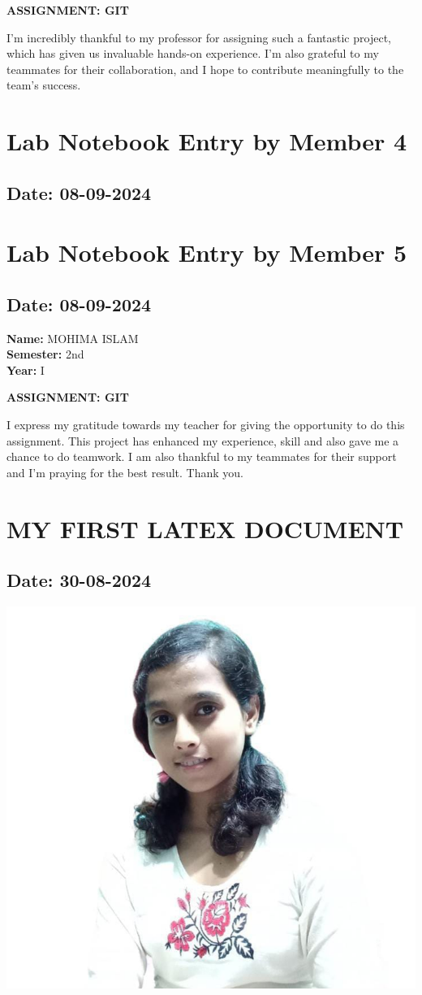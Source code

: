 \documentclass[12pt]{article}
\begin{document}
\begin{center}
\Huge \textbf{ASSIGNMENT: GIT}
\end{center}

I'm incredibly thankful to my professor for assigning such a fantastic project, which has given us invaluable hands-on experience. I'm also grateful to my teammates for their collaboration, and I hope to contribute meaningfully to the team's success.

\newpage
\section{Lab Notebook Entry by Member 4}
\subsection*{Date: 08-09-2024}
\newpage


\section{Lab Notebook Entry by Member 5}
\subsection*{Date: 08-09-2024}

\begin{flushright}
\textbf{Name:} MOHIMA ISLAM \\
\textbf{Semester:} 2nd \\
\textbf{Year:} I \\
\end{flushright}

\begin{center}
\Huge \textbf{ASSIGNMENT: GIT}
\end{center}

I express my gratitude towards my teacher for giving the opportunity to do this assignment. This project has enhanced my experience, skill and also gave me a chance to do teamwork. I am also thankful to my teammates for their support and I'm praying for the best result. Thank you.
\newpage
\section{MY FIRST LATEX DOCUMENT}
\subsection*{Date: 30-08-2024}
 \begin{center}
        \includegraphics[width=0.5\linewidth]{mohima.jpg}
     \end{center}
\end{document}
